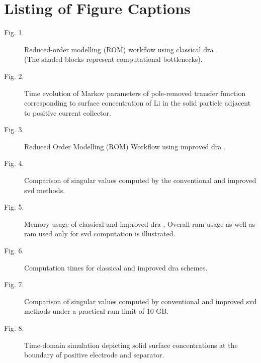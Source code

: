 \section*{Listing of Figure Captions}

\begin{description}
	\item[Fig. 1.]   Reduced-order modelling (ROM) workflow using classical \gls{dra} .\\ (The shaded blocks represent computational bottlenecks).\\
	\item[Fig. 2.]   Time evolution of Markov parameters of pole-removed transfer function corresponding to surface concentration of Li in the solid particle adjacent to positive current collector.\\
	\item[Fig. 3.]   Reduced Order Modelling (ROM) Workflow using improved \gls{dra} .\\
	\item[Fig. 4.]   Comparison of singular values computed by the conventional and improved \gls{svd} methods.\\
	\item[Fig. 5.]	 Memory usage of classical and improved \gls{dra} . Overall \gls{ram} usage as well as \gls{ram} used only for \gls{svd} computation is illustrated.\\
	\item[Fig. 6.] 	 Computation times for classical and improved \gls{dra} schemes.\\
	\item[Fig. 7.]	 Comparison of singular values computed by conventional and improved \gls{svd} methods under a practical \gls{ram} limit of 10 GB.\\
	\item[Fig. 8.]	 Time-domain simulation depicting solid surface concentrations at the boundary of positive electrode and separator.\\
\end{description}



\newpage
\singlespacing


